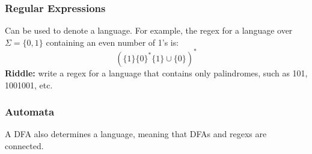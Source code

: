 \documentclass{report}
\begin{document}
\subsubsection{Regular Expressions}
Can be used to denote a language. For example, the regex for a language over $\Sigma = \{0,1\}$ containing an even number of 1's is:
$${(\{1\}\{0\}^*\{1\} \cup \{0\})}^*$$
\textbf{Riddle:} write a regex for a language that contains only palindromes, such as 101, 1001001, etc.
\subsubsection{Automata}
A DFA also determines a language, meaning that DFAs and regexs are connected.
\end{document}
